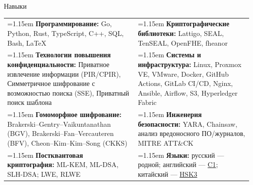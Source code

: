 \documentclass[11pt,a4paper]{article}
\newcommand{\cvrow}[2]{%
  \noindent
  \begin{minipage}[t]{0.145\textwidth}
    \vspace{0pt}%
    \raggedright
    \fontsize{10.5}{12.5}\selectfont
    #1
  \end{minipage}%
  \hfill
  \begin{minipage}[t]{0.835\textwidth}
    \vspace{0pt}%
    #2
  \end{minipage}\par
}
\newcommand{\skillcell}[2]{%
  \noindent
  \hangindent=1.15em
  \hangafter=1
  \makebox[1.15em][l]{$\diamond$}%
  \textbf{#1} #2%
}
\begin{document}
\cvrow{Навыки}{%
  \begin{tabularx}{\linewidth}
    {@{}>{\raggedright\arraybackslash}X
    @{\hspace{1.2em}}
    >{\raggedright\arraybackslash}X@{}}

    \skillcell{Программирование:}{%
      Go, Python, Rust, TypeScript, C++, SQL, Bash, LaTeX}
    &
    \skillcell{Криптографические библиотеки:}{%
      Lattigo, SEAL, TenSEAL, OpenFHE, fheanor}
    \\[0.20em]

    \skillcell{Технологии повышения конфиденциальности:}{%
      Приватное извлечение информации (PIR/CPIR),
      Симметричное шифрование с возможностью поиска (SSE),
      Приватный поиск шаблона}
    &
    \skillcell{Системы и инфраструктура:}{%
      Linux, Proxmox VE, VMware, Docker,
      GitHub Actions, GitLab CI/CD, Nginx, Ansible,
      Airflow, S3, Hyperledger Fabric}
    \\[0.20em]

    \skillcell{Гомоморфное шифрование:}{%
      Brakerski--Gentry--Vaikuntanathan (BGV),
      Brakerski--Fan--Vercauteren (BFV),
      Cheon--Kim--Kim--Song (CKKS)}
    &
    \skillcell{Инженерия безопасности:}{%
      YARA, Chainsaw, анализ вредоносного ПО/журналов,
      MITRE ATT\&CK}
    \\[0.20em]

    \skillcell{Постквантовая криптография:}{%
      ML-KEM, ML-DSA, SLH-DSA; LWE, RLWE}
    &
    \skillcell{Языки:}{%
      русский --- родной;
      английский --- \href{https://iasenovets.github.io/files/toefl_8cd5f4a2b8ec8f34da49ea0faeef43f1.pdf}{C1};
      китайский --- \href{https://admin.chinesetest.cn/queryScore.do?sid=c2tActR9Wb\%2704b861aefbdc5e9fd0b44afa717d08cbceb0720e582ce25f\%2724d7sWsQ5nVUQSwD}{HSK3}}
  \end{tabularx}
}

\vspace{0.75em}
\end{document}
